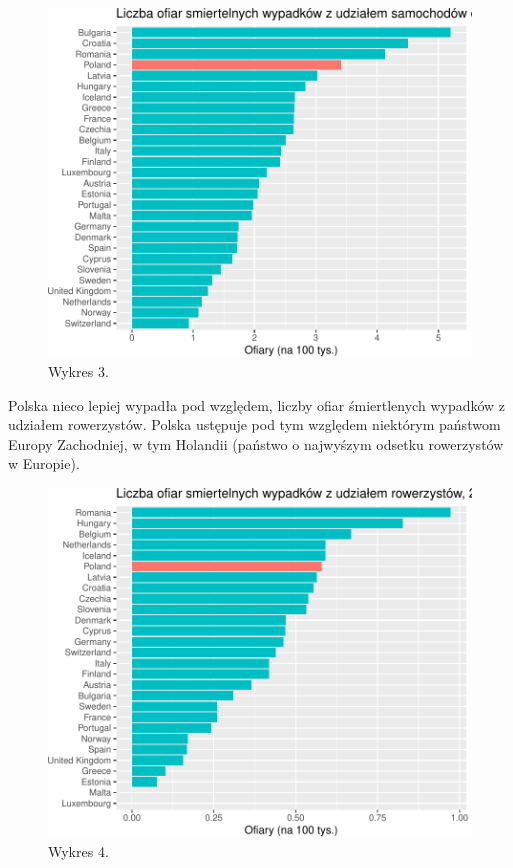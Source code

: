 \documentclass[
]{article}
\begin{document}
\begin{figure}

\includegraphics{raport_wypadki_files/figure-latex/unnamed-chunk-8-1} \hfill{}

\caption{Wykres 3.}\label{fig:unnamed-chunk-8}
\end{figure}

Polska nieco lepiej wypadła pod względem, liczby ofiar śmiertlenych
wypadków z udziałem rowerzystów. Polska ustępuje pod tym względem
niektórym państwom Europy Zachodniej, w tym Holandii (państwo o
najwyśzym odsetku rowerzystów w Europie).

\begin{figure}

\includegraphics{raport_wypadki_files/figure-latex/unnamed-chunk-9-1} \hfill{}

\caption{Wykres 4.}\label{fig:unnamed-chunk-9}
\end{figure}
\end{document}

